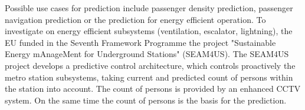 Possible use cases for prediction include passenger density prediction, passenger navigation prediction or the prediction for energy efficient operation.
% 
% 
To investigate on energy efficient subsystems (ventilation, escalator, lightning), the EU funded in the Seventh Framework Programme the project "Sustainable Energy mAnageMent for Underground Stations" (SEAM4US). The SEAM4US project develops a predictive control architecture, which controls proactively the metro station subsystems, taking current and predicted count of persons within the station into account. The count of persons is provided by an enhanced CCTV system. On the same time the count of persons is the basis for the prediction.

